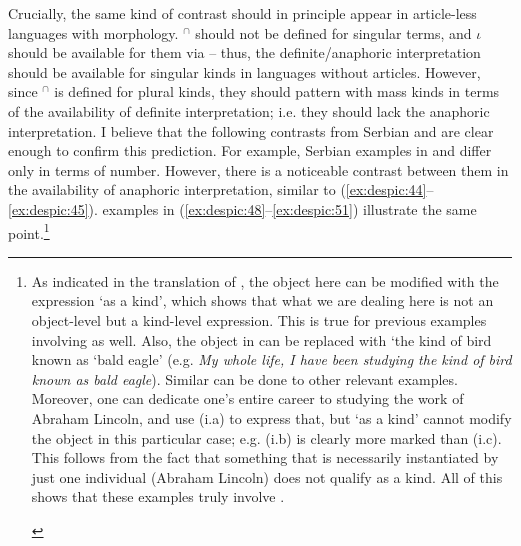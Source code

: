 \documentclass[output=paper,
modfonts
]{langscibook}
\begin{document}
	Crucially, the same kind of contrast should in principle appear in article-less languages with 
	morphology. $^\cap$ should not be defined for singular terms, and $\iota$ should be available for them via  -- thus, the definite/anaphoric interpretation should be available for singular kinds in languages without articles. However, since $^\cap$ is defined for plural kinds, they should pattern with mass kinds in terms of the availability of definite interpretation; i.e. they should lack the anaphoric interpretation. I believe that the following contrasts from Serbian and  are clear enough to confirm this prediction. For example, Serbian examples in  and  differ only in
	terms of number. However, there is a noticeable contrast between them in the availability of anaphoric interpretation, similar to (\ref{ex:despic:44}--\ref{ex:despic:45}).  examples in (\ref{ex:despic:48}--\ref{ex:despic:51}) illustrate the same point.\footnote{As indicated in the translation of , the object here can be modified with the expression `as a kind', which shows that what we are dealing here is not an object-level but a kind-level expression. This is true for previous examples involving  as well. Also, the object in  can be replaced with `the kind of bird known as `bald eagle' (e.g. \textit{My whole life, I have been studying the kind of bird known as bald eagle}). Similar can be done to other relevant examples. Moreover, one can dedicate one's entire career to studying the work of Abraham Lincoln, and use (i.a) to express that, but `as a kind' cannot modify the object in this particular case; e.g. (i.b) is clearly more marked than (i.c). This follows from the fact that something that is necessarily instantiated by just one individual (Abraham Lincoln) does not qualify as a kind. All of this shows that these examples truly involve .
		\begin{exe}  
		 \label{ex:despic:n10}	
		\z 
		\end{exe} 
}
\end{document}
